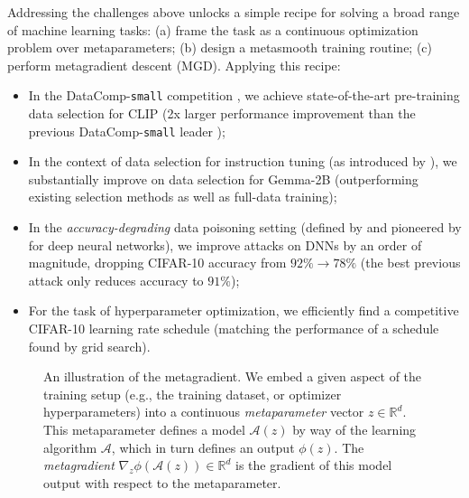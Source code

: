 Addressing the challenges above
unlocks a simple recipe
for solving a broad range of machine learning tasks:
(a) frame the task as a continuous optimization problem over metaparameters;
(b) design a metasmooth training routine;
(c) perform metagradient descent (MGD).
Applying this recipe:
\begin{itemize}
  \item In the DataComp-\texttt{small} competition \citep{gadre2024datacomp},
  we achieve state-of-the-art pre-training data selection for CLIP
    (2x larger performance improvement than the previous
    DataComp-\texttt{small} leader \citep{ecodatum2024ecodatum});
  \item In the context of data selection for instruction tuning (as introduced by \citet{xia2024less}),
    we substantially improve on data selection for Gemma-2B
    (outperforming existing selection methods
    as well as full-data training);
    \item In the {\em accuracy-degrading} data poisoning setting
    (defined by \citet{huber1964robust} and pioneered by
    \citet{lu2022indiscriminate} for deep neural networks),
      we improve attacks on DNNs by an order of magnitude,
      dropping CIFAR-10 accuracy from $92\%\!\to\! 78\%$
      (the best previous attack \citep{lu2023exploring} 
      only reduces accuracy to $91\%$);
  \item For the task of hyperparameter optimization, we 
    efficiently find a competitive CIFAR-10 learning rate schedule 
    (matching the performance of a schedule found by grid search).
\end{itemize}





\begin{figure}[h]
  \centering
  \caption{An illustration of the metagradient.
    We embed a given aspect of the training setup (e.g., the training
    dataset, or optimizer hyperparameters)
    into a continuous {\em metaparameter} vector $z \in \mathbb{R}^d$.
    This metaparameter defines a model $\mathcal{A}(z)$
    by way of the learning algorithm $\mathcal{A}$,
    which in turn defines an output $\phi(z)$.
    The {\em metagradient}
    $\nabla_z \phi(\mathcal{A}(z)) \in \mathbb{R}^d$
    is the gradient of this model output with respect to
  the metaparameter.}
  \label{fig:meta_gradient}
\end{figure}
